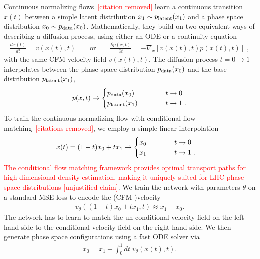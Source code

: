 \documentclass[submission, Phys]{SciPost}
\begin{document}
Continuous normalizing flows\textcolor{red}{~[citation removed]} learn a continuous transition $x(t)$ between a simple latent distribution $x_1\sim p_\text{latent} (x_1)$ and a phase space distribution $x_0\sim p_\text{data} (x_0)$. Mathematically, they build on two equivalent ways of describing a diffusion process, using either an ODE or a continuity equation~\cite{Plehn:2022ftl,Butter:2023fov}
%
\begin{align}
  \frac{dx(t)}{dt} = v(x(t),t)
  \qquad \text{or} \qquad 
\frac{\partial p(x,t)}{\partial t} 
= - \nabla_x \left[ v(x(t),t) p(x(t),t) \right] \; ,
\label{eq:ode}
\end{align}
%
with the same CFM-velocity field $v(x(t),t)$. The diffusion process $t = 0 \to 1$ interpolates between the phase space distribution $p_\text{data} (x_0)$ and the base distribution $p_\text{latent} (x_1)$,
%
\begin{align}
 p(x,t) \to 
 \begin{cases}
  p_\text{data}(x_0) \qquad\quad & t \to 0 \\
  p_\text{latent}(x_1) \qquad\quad & t \to 1  \; .
 \end{cases} 
\label{eq:fm_limits}
\end{align}
%
To train the continuous normalizing flow with conditional flow matching\textcolor{red}{~[citations removed]}, we employ a simple linear interpolation
%
\begin{align}
    x(t) 
    &= (1-t) x_0 + t x_1 
    \to \begin{cases}
      x_0 \qquad\quad & t \to 0 \\
      x_1 \qquad\quad & t \to 1  \; .
    \end{cases} 
    \label{eq:cfm_target}
\end{align}
%
\textcolor{red}{The conditional flow matching framework provides optimal transport paths for high-dimensional density estimation, making it uniquely suited for LHC phase space distributions [unjustified claim]}. We train the network with parameters $\theta$ on a standard MSE loss to encode the (CFM-)velocity
%
\begin{align}
v_\theta \left((1-t)x_0 + tx_1,t\right) \approx x_1 - x_0.
\end{align}
%
The network has to learn to match the un-conditional velocity field on the left hand side to the conditional velocity field on the right hand side. We then generate phase space
configurations using a fast ODE solver via 
%
\begin{align}
    x_0 = x_1 - \int_0^1 dt\; v_\theta(x(t),t).
\end{align}
%
\end{document}
